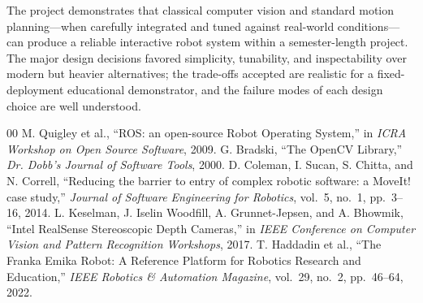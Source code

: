 \documentclass[conference]{IEEEtran}
\begin{document}
The project demonstrates that classical computer vision and standard
motion planning---when carefully integrated and tuned against
real-world conditions---can produce a reliable interactive robot
system within a semester-length project. The major design decisions
favored simplicity, tunability, and inspectability over modern but
heavier alternatives; the trade-offs accepted are realistic for a
fixed-deployment educational demonstrator, and the failure modes of
each design choice are well understood.

\begin{thebibliography}{00}
 M. Quigley et al., ``ROS: an open-source Robot Operating
System,'' in \textit{ICRA Workshop on Open Source Software}, 2009.
 G. Bradski, ``The OpenCV Library,'' \textit{Dr. Dobb's
Journal of Software Tools}, 2000.
 D. Coleman, I. Sucan, S. Chitta, and N. Correll,
``Reducing the barrier to entry of complex robotic software: a
MoveIt! case study,'' \textit{Journal of Software Engineering for
Robotics}, vol.~5, no.~1, pp.~3--16, 2014.
 L. Keselman, J. Iselin Woodfill, A. Grunnet-Jepsen,
and A. Bhowmik, ``Intel RealSense Stereoscopic Depth Cameras,'' in
\textit{IEEE Conference on Computer Vision and Pattern Recognition
Workshops}, 2017.
 T. Haddadin et al., ``The Franka Emika Robot: A
Reference Platform for Robotics Research and Education,''
\textit{IEEE Robotics \& Automation Magazine}, vol.~29, no.~2,
pp.~46--64, 2022.
\end{thebibliography}
\end{document}
